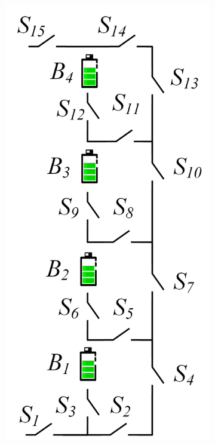 \documentclass{article}
\begin{document}
\begin{figure}[htbp]
\begin{subfigure}[b]{0.2\textwidth}
        \includegraphics[width=\textwidth]{stru-L-origin.png}
        \caption{}
        \label{fig:study-stru-Lawson}

\end{subfigure}
\end{figure}
\end{document}
